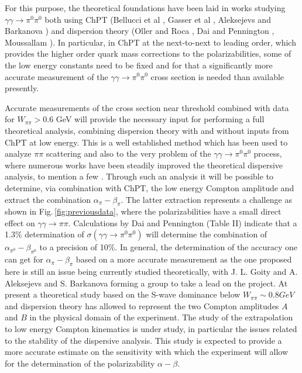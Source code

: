 For
this purpose, the theoretical foundations have been laid in works
studying $\gamma\gamma\to \pi^0\pi^0$ both using ChPT (Bellucci et al
\cite{Bellucci:1994hx,Bellucci:1994eb}, Gasser et al
\cite{Gasser:2005ud}, Aleksejevs and Barkanova
\cite{Aleksejevs:2014eea}) and dispersion theory (Oller and Roca
\cite{Oller:2008kf}, Dai and Pennington
\cite{Dai:2014zta,Dai:2014lza}, Moussallam
\cite{Moussallam:2013una}). In particular, in ChPT at the next-to-next
to leading order, which provides the higher order quark mass
corrections to the polarizabilities, some of the low energy constants
need to be fixed and for that a significantly more accurate
measurement of the $\gamma\gamma\to \pi^0\pi^0$ cross section is
needed than available presently.

Accurate measurements of the cross section near threshold combined
with data for $W_{\pi\pi}>0.6$ GeV will provide the necessary input
for performing a full theoretical analysis, combining dispersion
theory with and without inputs from ChPT at low energy. This is a well
established method which has been used to analyze $\pi\pi$
scattering and also to the very problem of the $\gamma\gamma \to \pi^0\pi^0$
process, where numerous works have been steadily improved the theoretical
dispersive analysis, to mention a
few \cite{Donoghue:1993kw,Oller:2007sh,Oller:2008k,Moussallam:2013una,Dai:2016ytz}.
Through such an analysis it will be possible to determine,
via combination with ChPT, the low energy Compton amplitude and
extract the   combination $\alpha_\pi-\beta_\pi$. The
latter extraction represents a challenge as shown in
Fig.\,\ref{fig:previousdata}, where the polarizabilities have a small
direct effect on $\gamma\gamma\to \pi\pi$.  Calculations by Dai and
Pennington (Table II) \cite{Dai:2016ytz} indicate that a 1.3\%
determination of $\sigma(\gamma\gamma\rightarrow\pi^0\pi^0)$ will
determine the combination of $\alpha_{\pi^0}-\beta_{\pi^0}$ to a
precision of 10\%. 
In general, the
determination of the accuracy one can get for $\alpha_\pi-\beta_\pi$
based on a more accurate measurement as the one proposed here is still
an issue being currently studied theoretically, with J. L.  Goity and
A. Aleksejevs and S. Barkanova forming a group to take a lead on the project. 
At present a theoretical study based on the S-wave dominance below
$W_{\pi\pi}\sim 0.8 GeV$ and dispersion theory has allowed to represent the two
Compton amplitudes $A$ and $B$ in the physical domain of the experiment. The
study of the extrapolation to low energy Compton kinematics is under study, in
particular the issues related to the stability of the dispersive analysis. This
study is expected to provide a more accurate estimate on the sensitivity with
which the experiment will allow for the determination of the polarizability
$\alpha-\beta$.


